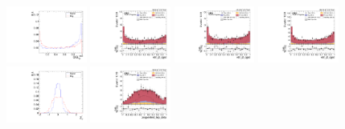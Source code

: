 \begin{figure}[!ht]
  \includegraphics[width=0.235\textwidth]{analysis_plots/tmva_plots/zv_BDTG14_vbf2_AK4_qgid.pdf} \hspace{-12pt}
  \includegraphics[width=0.235\textwidth]{analysis_plots/2016_zv/cr_vjets_l/vbf_j2_qgid.pdf} \hspace{-12pt}
  \includegraphics[width=0.235\textwidth]{analysis_plots/2017_zv/cr_vjets_l/vbf_j2_qgid.pdf} \hspace{-12pt}
  \includegraphics[width=0.235\textwidth]{analysis_plots/2018_zv/cr_vjets_l/vbf_j2_qgid.pdf} \hspace{-12pt} \\ \vspace{-1pt}
  \includegraphics[width=0.235\textwidth]{analysis_plots/tmva_plots/zv_BDTG14_zeppLep_deta.pdf} \hspace{-12pt}
  \includegraphics[width=0.235\textwidth]{analysis_plots/2016_zv/cr_vjets_l/zeppenfeld_lep_deta.pdf} \hspace{-12pt}

\end{figure}
